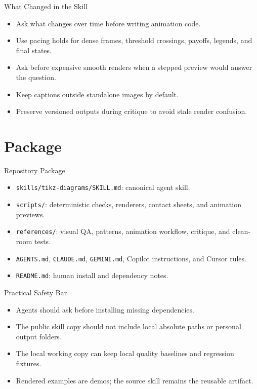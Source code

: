 \documentclass{beamer}
\begin{document}
\begin{frame}{What Changed in the Skill}
  \begin{itemize}[<+->]
    \item Ask what changes over time before writing animation code.
    \item Use pacing holds for dense frames, threshold crossings, payoffs, legends, and final states.
    \item Ask before expensive smooth renders when a stepped preview would answer the question.
    \item Keep captions outside standalone images by default.
    \item Preserve versioned outputs during critique to avoid stale render confusion.
  \end{itemize}
\end{frame}

\section{Package}

\begin{frame}{Repository Package}
  \small
  \begin{itemize}[<+->]
    \item \texttt{skills/tikz-diagrams/SKILL.md}: canonical agent skill.
    \item \texttt{scripts/}: deterministic checks, renderers, contact sheets, and animation previews.
    \item \texttt{references/}: visual QA, patterns, animation workflow, critique, and clean-room tests.
    \item \texttt{AGENTS.md}, \texttt{CLAUDE.md}, \texttt{GEMINI.md}, Copilot instructions, and Cursor rules.
    \item \texttt{README.md}: human install and dependency notes.
  \end{itemize}
\end{frame}

\begin{frame}{Practical Safety Bar}
  \begin{itemize}[<+->]
    \item Agents should ask before installing missing dependencies.
    \item The public skill copy should not include local absolute paths or personal output folders.
    \item The local working copy can keep local quality baselines and regression fixtures.
    \item Rendered examples are demos; the source skill remains the reusable artifact.
  \end{itemize}
\end{frame}
\end{document}
